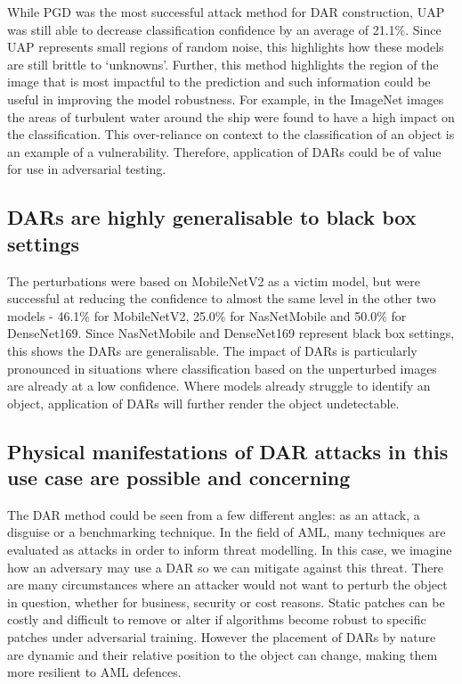 \documentclass{article}
\begin{document}
While PGD was the most successful attack method for DAR construction, UAP was still able to decrease classification confidence by an average of 21.1\%. Since UAP represents small regions of random noise, this highlights how these models are still brittle to `unknowns'. Further, this method highlights the region of the image that is most impactful to the prediction and such information could be useful in improving the model robustness. For example, in the ImageNet images the areas of turbulent water around the ship were found to have a high impact on the classification. This over-reliance on context to the classification of an object is an example of a vulnerability. Therefore, application of DARs could be of value for use in adversarial testing.

\subsection{DARs are highly generalisable to black box settings}

The perturbations were based on MobileNetV2 as a victim model, but were successful at reducing the confidence to almost the same level in the other two models - 46.1\% for MobileNetV2, 25.0\% for NasNetMobile and 50.0\% for DenseNet169. Since NasNetMobile and DenseNet169 represent black box settings, this shows the DARs are generalisable. The impact of DARs is particularly pronounced in situations where classification based on the unperturbed images are already at a low confidence. Where models already struggle to identify an object, application of DARs will further render the object undetectable.

\subsection{Physical manifestations of DAR attacks in this use case are possible and concerning}

The DAR method could be seen from a few different angles: as an attack, a disguise or a benchmarking technique. In the field of AML, many techniques are evaluated as attacks in order to inform threat modelling. In this case, we imagine how an adversary may use a DAR so we can mitigate against this threat. There are many circumstances where an attacker would not want to perturb the object in question, whether for business, security or cost reasons. Static patches can be costly and difficult to remove or alter if algorithms become robust to specific patches under adversarial training. However the placement of DARs by nature are dynamic and their relative position to the object can change, making them more resilient to AML defences.  
\end{document}
